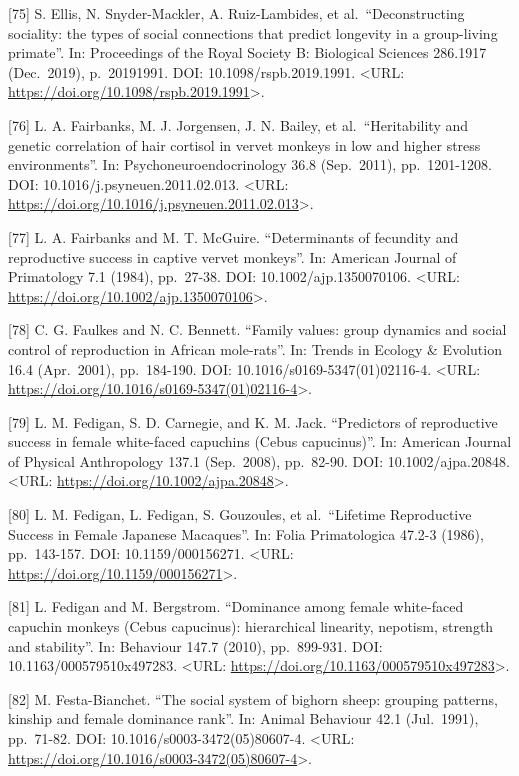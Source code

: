 \documentclass[
]{article}
\begin{document}
{[}75{]} S. Ellis, N. Snyder-Mackler, A. Ruiz-Lambides, et
al.~``Deconstructing sociality: the types of social connections that
predict longevity in a group-living primate''. In: Proceedings of the
Royal Society B: Biological Sciences 286.1917 (Dec.~2019), p.~20191991.
DOI: 10.1098/rspb.2019.1991. \textless URL:
\url{https://doi.org/10.1098/rspb.2019.1991}\textgreater.

{[}76{]} L. A. Fairbanks, M. J. Jorgensen, J. N. Bailey, et
al.~``Heritability and genetic correlation of hair cortisol in vervet
monkeys in low and higher stress environments''. In:
Psychoneuroendocrinology 36.8 (Sep.~2011), pp.~1201-1208. DOI:
10.1016/j.psyneuen.2011.02.013. \textless URL:
\url{https://doi.org/10.1016/j.psyneuen.2011.02.013}\textgreater.

{[}77{]} L. A. Fairbanks and M. T. McGuire. ``Determinants of fecundity
and reproductive success in captive vervet monkeys''. In: American
Journal of Primatology 7.1 (1984), pp.~27-38. DOI:
10.1002/ajp.1350070106. \textless URL:
\url{https://doi.org/10.1002/ajp.1350070106}\textgreater.

{[}78{]} C. G. Faulkes and N. C. Bennett. ``Family values: group
dynamics and social control of reproduction in African mole-rats''. In:
Trends in Ecology \& Evolution 16.4 (Apr.~2001), pp.~184-190. DOI:
10.1016/s0169-5347(01)02116-4. \textless URL:
\url{https://doi.org/10.1016/s0169-5347(01)02116-4}\textgreater.

{[}79{]} L. M. Fedigan, S. D. Carnegie, and K. M. Jack. ``Predictors of
reproductive success in female white-faced capuchins (Cebus
capucinus)''. In: American Journal of Physical Anthropology 137.1
(Sep.~2008), pp.~82-90. DOI: 10.1002/ajpa.20848. \textless URL:
\url{https://doi.org/10.1002/ajpa.20848}\textgreater.

{[}80{]} L. M. Fedigan, L. Fedigan, S. Gouzoules, et al.~``Lifetime
Reproductive Success in Female Japanese Macaques''. In: Folia
Primatologica 47.2-3 (1986), pp.~143-157. DOI: 10.1159/000156271.
\textless URL: \url{https://doi.org/10.1159/000156271}\textgreater.

{[}81{]} L. Fedigan and M. Bergstrom. ``Dominance among female
white-faced capuchin monkeys (Cebus capucinus): hierarchical linearity,
nepotism, strength and stability''. In: Behaviour 147.7 (2010),
pp.~899-931. DOI: 10.1163/000579510x497283. \textless URL:
\url{https://doi.org/10.1163/000579510x497283}\textgreater.

{[}82{]} M. Festa-Bianchet. ``The social system of bighorn sheep:
grouping patterns, kinship and female dominance rank''. In: Animal
Behaviour 42.1 (Jul.~1991), pp.~71-82. DOI:
10.1016/s0003-3472(05)80607-4. \textless URL:
\url{https://doi.org/10.1016/s0003-3472(05)80607-4}\textgreater.
\end{document}
